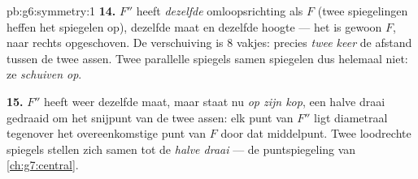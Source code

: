 \begin{solution}{pb:g6:symmetry:1}
\textbf{14.} $F''$ heeft \emph{dezelfde} omloopsrichting als $F$ (twee
spiegelingen heffen het spiegelen op), dezelfde maat en dezelfde hoogte --- het is
gewoon $F$, naar rechts opgeschoven. De verschuiving is $8$ vakjes: precies
\emph{twee keer} de afstand tussen de twee assen. Twee parallelle spiegels samen
spiegelen dus helemaal niet: ze \emph{schuiven op}.

\textbf{15.} $F''$ heeft weer dezelfde maat, maar staat nu \emph{op zijn kop},
een halve draai gedraaid om het snijpunt van de twee assen: elk punt van $F''$
ligt diametraal tegenover het overeenkomstige punt van $F$ door dat middelpunt.
Twee loodrechte spiegels stellen zich samen tot de \emph{halve draai} --- de
puntspiegeling van \cref{ch:g7:central}.
\end{solution}
